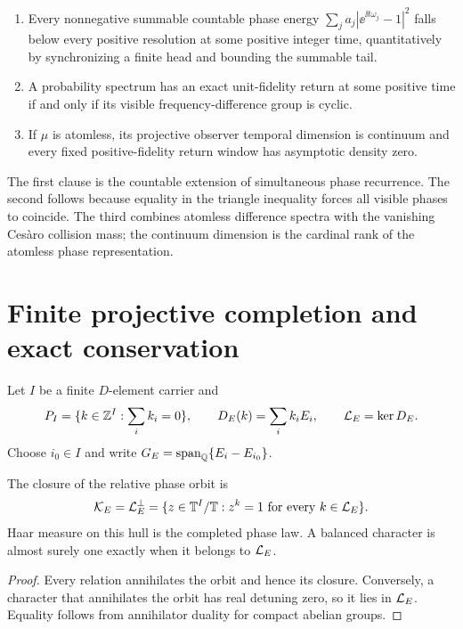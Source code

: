 \begin{theorem}
\leavevmode
\begin{enumerate}[leftmargin=1.6em]
\item Every nonnegative summable countable phase energy
  $\sum_j a_j|\ee^{\ii t\omega_j}-1|^2$ falls below every positive
  resolution at some positive integer time, quantitatively by synchronizing
  a finite head and bounding the summable tail.
\item A probability spectrum has an exact unit-fidelity return at some
  positive time if and only if its visible frequency-difference group is
  cyclic.
\item If $\mu$ is atomless, its projective observer temporal dimension is
  continuum and every fixed positive-fidelity return window has asymptotic
  density zero.
\end{enumerate}
\end{theorem}

The first clause is the countable extension of simultaneous phase recurrence.
The second follows because equality in the triangle inequality forces all
visible phases to coincide.  The third combines atomless difference spectra
with the vanishing Ces\`aro collision mass; the continuum dimension is the
cardinal rank of the atomless phase representation.

\section{Finite projective completion and exact conservation}

Let $I$ be a finite $D$-element carrier and
\[
 P_I=\{k\in\mathbb Z^I:\sum_ik_i=0\},\qquad
 D_E(k)=\sum_i k_iE_i,
 \qquad\mathcal L_E=\ker D_E.
\]
Choose $i_0\in I$ and write
$G_E=\operatorname{span}_{\mathbb Q}\{E_i-E_{i_0}\}$.

\begin{theorem}
The closure of the relative phase orbit is
\[
 \mathcal K_E=\mathcal L_E^\perp
 =\{z\in\mathbb T^I/\mathbb T:z^k=1\text{ for every }k\in\mathcal L_E\}.
\]
Haar measure on this hull is the completed phase law.  A balanced character
is almost surely one exactly when it belongs to $\mathcal L_E$.
\end{theorem}

\begin{proof}
Every relation annihilates the orbit and hence its closure.  Conversely, a
character that annihilates the orbit has real detuning zero, so it lies in
$\mathcal L_E$.  Equality follows from annihilator duality for compact abelian
groups.
\end{proof}


